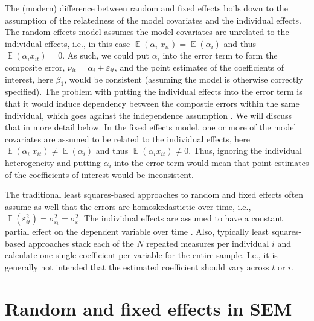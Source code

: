 \documentclass[]{interact}
\theoremstyle{plain}%
\theoremstyle{definition}
\theoremstyle{remark}
\begin{document}
The (modern) difference between random and fixed effects boils down to
the assumption of the relatedness of the model covariates and the
individual effects. The random effects model assumes the model
covariates are unrelated to the individual effects, i.e., in this case
\(\mathop{\mathrm{\mathbb{E}}}(\alpha_{i} | x_{it}) = \mathop{\mathrm{\mathbb{E}}}(\alpha_{i})\)
and thus \(\mathop{\mathrm{\mathbb{E}}}(\alpha_{i}x_{it}) = 0\). As
such, we could put \(\alpha_{i}\) into the error term to form the
composite error, \(\nu_{it} = \alpha_{i} + \varepsilon_{it}\), and the
point estimates of the coefficients of interest, here \(\beta_{1}\),
would be consistent (assuming the model is otherwise correctly
specified). The problem with putting the individual effects into the
error term is that it would induce dependency between the compostie
errors within the same individual, which goes against the independence
assumption \citep{Wooldridge2012, Schmidheiny2019}. We will discuss that
in more detail below. In the fixed effects model, one or more of the
model covariates are assumed to be related to the individual effects,
here
\(\mathop{\mathrm{\mathbb{E}}}(\alpha_{i} | x_{it}) \ne \mathop{\mathrm{\mathbb{E}}}(\alpha_{i})\)
and thus \(\mathop{\mathrm{\mathbb{E}}}(\alpha_{i}x_{it}) \ne 0\). Thus,
ignoring the individual heterogeneity and putting \(\alpha_{i}\) into
the error term would mean that point estimates of the coefficients of
interest would be inconsistent.

The traditional least squares-based approaches to random and fixed
effects often assume as well that the errors are homoskedastictic over
time, i.e.,
\(\mathop{\mathrm{\mathbb{E}}}(\varepsilon_{it}^{2}) = \sigma_{\varepsilon_{t}}^{2} = \sigma_{\varepsilon}^{2}\).
The individual effects are assumed to have a constant partial effect on
the dependent variable over time \citep[p.~248]{Wooldridge2012}. Also,
typically least squares-based approaches stack each of the \(N\)
repeated measures per individual \(i\) and calculate one single
coefficient per variable for the entire sample. I.e., it is generally
not intended that the estimated coefficient should vary across \(t\) or
\(i\).

\hypertarget{random-and-fixed-effects-in-sem}{%
\section{Random and fixed effects in
SEM}\label{random-and-fixed-effects-in-sem}}
\end{document}
